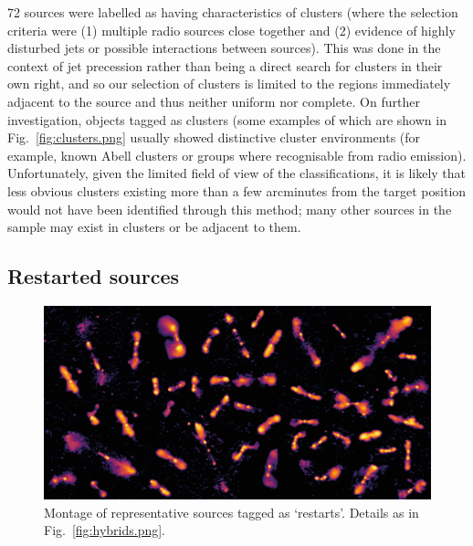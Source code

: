 \documentclass{aa}
\begin{document}
72 sources were labelled as having characteristics of clusters (where the selection criteria were (1) multiple radio sources close together and (2) evidence of highly disturbed jets or possible interactions between sources). This was done in the context of jet precession rather than being a direct search for clusters in their own right, and so our selection of clusters is limited to the regions immediately adjacent to the source and thus neither uniform nor complete. On further investigation, objects tagged as clusters (some examples of which are shown in Fig.\ \ref{fig:clusters.png} usually showed distinctive cluster environments (for example, known Abell clusters or groups where recognisable from radio emission). Unfortunately, given the limited field of view of the classifications, it is likely that less obvious clusters existing more than a few arcminutes from the target position would not have been identified through this method; many other sources in the sample may exist in clusters or be adjacent to them. 

\subsection{Restarted sources}
\begin{figure}
\includegraphics[width=1\linewidth]{Images/galaxies/restarts.png}
\caption{Montage of representative sources tagged as `restarts'. Details as in Fig.\ \ref{fig:hybrids.png}.}
\label{fig:restarts.png}
\end{figure}
\end{document}
